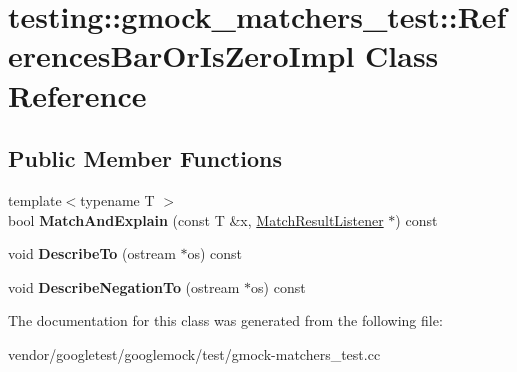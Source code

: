 \hypertarget{classtesting_1_1gmock__matchers__test_1_1_references_bar_or_is_zero_impl}{}\section{testing\+:\+:gmock\+\_\+matchers\+\_\+test\+:\+:References\+Bar\+Or\+Is\+Zero\+Impl Class Reference}
\label{classtesting_1_1gmock__matchers__test_1_1_references_bar_or_is_zero_impl}
\subsection*{Public Member Functions}
\begin{DoxyCompactItemize}
\item 
\mbox{\label{classtesting_1_1gmock__matchers__test_1_1_references_bar_or_is_zero_impl_ac74ff2f707bebea05a995beb77c77041}} 
{\footnotesize template$<$typename T $>$ }\\bool {\bfseries Match\+And\+Explain} (const T \&x, \mbox{\hyperlink{classtesting_1_1_match_result_listener}{Match\+Result\+Listener}} $\ast$) const
\item 
\mbox{\label{classtesting_1_1gmock__matchers__test_1_1_references_bar_or_is_zero_impl_a8d8496ad72753723598efd45e6a4dcbf}} 
void {\bfseries Describe\+To} (ostream $\ast$os) const
\item 
\mbox{\label{classtesting_1_1gmock__matchers__test_1_1_references_bar_or_is_zero_impl_a849b65d96bf7a31b7b0e81005e466605}} 
void {\bfseries Describe\+Negation\+To} (ostream $\ast$os) const
\end{DoxyCompactItemize}


The documentation for this class was generated from the following file\+:\begin{DoxyCompactItemize}
\item 
vendor/googletest/googlemock/test/gmock-\/matchers\+\_\+test.\+cc\end{DoxyCompactItemize}
